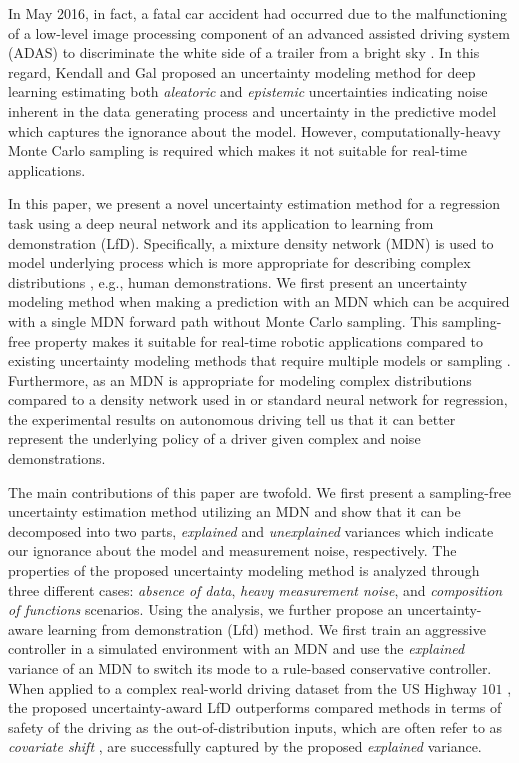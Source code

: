 \documentclass[letterpaper, 10 pt, conference]{ieeeconf}  %
\begin{document}
In May 2016, in fact, a fatal car accident had occurred 
due to the malfunctioning of a low-level image processing component
of an advanced assisted driving system (ADAS)
to discriminate the white side of a trailer from a bright sky
\cite{Tesla_16}.
In this regard, Kendall and Gal \cite{Kendall_17} 
proposed an uncertainty modeling method for deep learning
estimating both 
\textit{aleatoric} and \textit{epistemic} uncertainties indicating
noise inherent in the data generating process
and uncertainty in the predictive model
which captures the ignorance about the model. 
However, computationally-heavy Monte Carlo sampling is
required which makes it not suitable for real-time applications. 


In this paper, we present a novel uncertainty estimation method
for a regression task using a deep neural network and its application
to learning from demonstration (LfD).
Specifically, a mixture density network (MDN) \cite{Bishop_94} is used
to model underlying process which is more appropriate
for describing complex distributions \cite{Brando_17}, e.g., 
human demonstrations.
We first present an uncertainty modeling method when
making a prediction with an MDN which can be acquired with 
a single MDN forward path without Monte Carlo sampling. 
This sampling-free property makes it suitable for 
real-time robotic applications compared to 
existing uncertainty modeling methods that require multiple models 
\cite{Lakshminarayanan_16}
or sampling \cite{Gal_16, Gal_16_thesis, Kendall_17}.
Furthermore, as an MDN is appropriate for modeling 
complex distributions \cite{Mclachlan_88} compared to
a density network used in \cite{Kendall_17, Mclachlan_88}
or standard neural network for regression, 
the experimental results on autonomous driving tell us that 
it can better represent the underlying policy of a driver
given complex and noise demonstrations. 


The main contributions of this paper are twofold. 
We first present a sampling-free uncertainty estimation method 
utilizing an MDN
and show that it can be decomposed into two parts, 
\textit{explained} and \textit{unexplained} variances
which indicate our ignorance about the model
and measurement noise, respectively. 
The properties of the proposed uncertainty modeling method 
is analyzed through three different cases:
\textit{absence of data}, \textit{heavy measurement noise}, 
and \textit{composition of functions} scenarios. 
Using the analysis, we further propose an uncertainty-aware
learning from demonstration (Lfd) method. 
We first train an aggressive controller in a simulated environment
with an MDN and use the \textit{explained} variance of an MDN
to switch its mode to a rule-based conservative controller.
When applied to a complex real-world driving dataset
from the US Highway $101$ \cite{Colyar_07}, 
the proposed uncertainty-award LfD outperforms compared methods
in terms of safety of the driving as the out-of-distribution inputs, 
which are often refer to as
\textit{covariate shift} \cite{Ross_13}, 
are successfully captured by the proposed \textit{explained} variance. 
\end{document}
